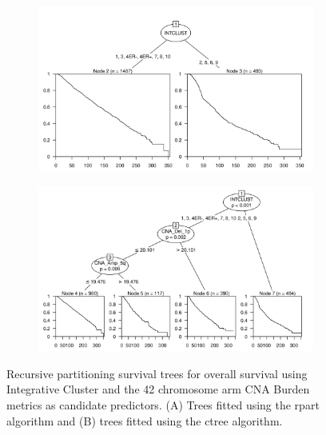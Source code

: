 \begin{figure}[!htb]
\centering

\vspace{0.5cm}

\begin{subfigure}{\textwidth}
\subcaption{}
\includegraphics[width=1\textwidth]{../figures/Appendices/Appendix_B/PA_PartyKit_Survival_Burden_OS_INTCLUST.png}
\end{subfigure}

\vspace{2cm}

\begin{subfigure}{\textwidth}
\subcaption{}
\includegraphics[width=1\textwidth]{../figures/Appendices/Appendix_B/PA_Ctree_Survival_Burden_OS_INTCLUST.png}
\end{subfigure}

\vspace{0.5cm}

\caption[Recursive partitioning survival trees for overall survival using Integrative Cluster and the 42 chromosome arm CNA Burden metrics as candidate predictors.]{Recursive partitioning survival trees for overall survival using Integrative Cluster and the 42 chromosome arm CNA Burden metrics as candidate predictors. (A) Trees fitted using the rpart algorithm and (B) trees fitted using the ctree algorithm.}
\end{figure}

